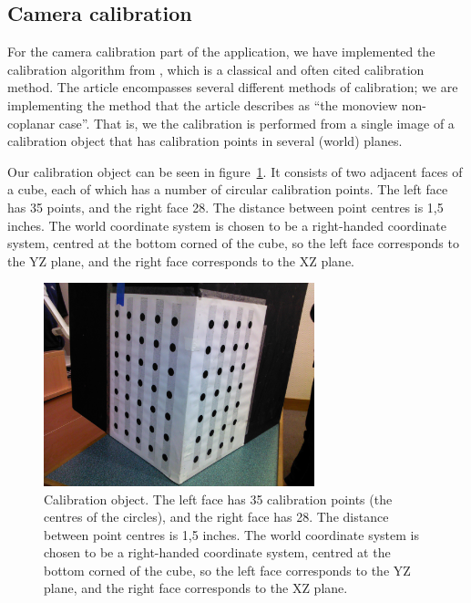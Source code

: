 \subsection{Camera calibration}
For the camera calibration part of the application, we have
implemented the calibration algorithm from \cite{TSAI}, which is a
classical and often cited calibration method. The article encompasses
several different methods of calibration; we are implementing the
method that the article describes as ``the monoview non-coplanar
case''. That is, we the calibration is performed from a single image
of a calibration object that has calibration points in several (world)
planes.

Our calibration object can be seen in figure~\ref{fig:calib-object}.
It consists of two adjacent faces of a cube, each of which has a
number of circular calibration points. The left face has 35 points,
and the right face 28. The distance between point centres is 1,5
inches. The world coordinate system is chosen to be a right-handed
coordinate system, centred at the bottom corned of the cube, so the
left face corresponds to the YZ plane, and the right face corresponds
to the XZ plane.

\begin{figure}[hb]
  \centering
  \includegraphics[width=0.7\textwidth]{figures/calibration-object}
  \caption[Calibration object]{Calibration object. The left face has
    35 calibration points (the centres of the circles), and the right
    face has 28. The distance between point centres is 1,5 inches. The
    world coordinate system is chosen to be a right-handed coordinate
    system, centred at the bottom corned of the cube, so the left face
    corresponds to the YZ plane, and the right face corresponds to the
    XZ plane.}
  \label{fig:calib-object}
\end{figure}

